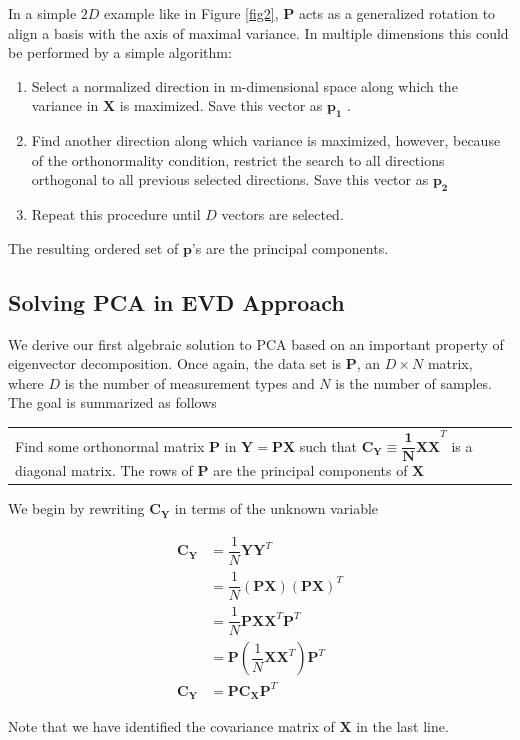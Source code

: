  In a simple $2D$ example like in Figure \ref{fig2}, $\pmb{P}$ acts as a generalized rotation to align a basis with the axis of maximal variance. In multiple dimensions this could be performed by a simple algorithm:
 \begin{enumerate}
\item Select a normalized direction in m-dimensional space along which the variance in $\pmb{X}$ is maximized. Save this vector as $\pmb{p_1}$ .
\item Find another direction along which variance is maximized, however, because of the orthonormality condition, restrict the search to all directions orthogonal to all previous selected directions. Save this vector as $\pmb{p_2}$
\item Repeat this procedure until $D$ vectors are selected.
 \end{enumerate}
The resulting ordered set of $\pmb{p}$'s are the principal components.




\subsection{Solving PCA in EVD Approach}
We derive our first algebraic solution to PCA based on an important property of eigenvector decomposition. Once again, the data set is $\pmb{P}$, an $D \times N$ matrix, where $D$ is the number of measurement types and $N$ is the number of samples. The goal is summarized as follows

\begin{center}
\begin{tabular}{p{12cm}}
Find some orthonormal matrix $\pmb{P}$ in $\pmb{Y = PX}$ such that $\pmb{C_Y \equiv \dfrac{1}{N}XX}^T$ is a diagonal matrix. The rows of  $\pmb{P}$  are the principal components of  $\pmb{X}$ 
\end{tabular}
\end{center}
We begin by rewriting $\pmb{C_Y}$ in terms of the unknown variable

\begin{align*}
\pmb{C_Y} &= \dfrac{1}{N}\pmb{YY}^T\\
&= \dfrac{1}{N}\pmb{(PX)(PX)}^T\\
&= \dfrac{1}{N}\pmb{PXX}^T\pmb{P}^T\\
&= \pmb{P}(\dfrac{1}{N}\pmb{XX}^T)\pmb{P}^T\\
\pmb{C_Y} &= \pmb{PC_XP}^T 
\end{align*}

Note that we have identified the covariance matrix of $\pmb{X}$  in the last line.

